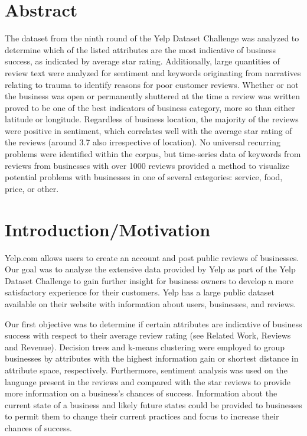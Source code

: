 
\section{Abstract}

\quad The dataset from the ninth round of the Yelp Dataset Challenge was analyzed to determine which of the listed attributes are the most indicative of business success, as indicated by average star rating. Additionally, large quantities of review text were analyzed for sentiment and keywords originating from narratives relating to trauma to identify reasons for poor customer reviews. Whether or not the business was open or permanently shuttered at the time a review was written proved to be one of the best indicators of business category, more so than either latitude or longitude. Regardless of business location, the majority of the reviews were positive in sentiment, which correlates well with the average star rating of the reviews (around 3.7 also irrespective of location). No universal recurring problems were identified within the corpus, but time-series data of keywords from reviews from businesses with over 1000 reviews provided a method to visualize potential problems with businesses in one of several categories: service, food, price, or other.

\section{Introduction/Motivation}

\quad Yelp.com allows users to create an account and post public reviews of businesses. Our goal was to analyze the extensive data provided by Yelp as part of the Yelp Dataset Challenge to gain further insight for business owners to develop a more satisfactory experience for their customers. Yelp has a large public dataset available on their website with information about users, businesses, and reviews.

\quad Our first objective was to determine if certain attributes are indicative of business success with respect to their average review rating (see Related Work, Reviews and Revenue). Decision trees and k-means clustering were employed to group businesses by attributes with the highest information gain or shortest distance in attribute space, respectively. Furthermore, sentiment analysis was used on the language present in the reviews and compared with the star reviews to provide more information on a business’s chances of success. Information about the current state of a business and likely future states could be provided to businesses to permit them to change their current practices and focus to increase their chances of success.

